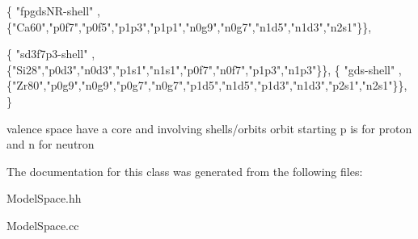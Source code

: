 \begin{DoxyCode}
\{ \textcolor{stringliteral}{"fpgdsNR-shell"}  ,   \{\textcolor{stringliteral}{"Ca60"},\textcolor{stringliteral}{"p0f7"},\textcolor{stringliteral}{"p0f5"},\textcolor{stringliteral}{"p1p3"},\textcolor{stringliteral}{"p1p1"},\textcolor{stringliteral}{"n0g9"},\textcolor{stringliteral}{"n0g7"},\textcolor{stringliteral}{"n1d5"},\textcolor{stringliteral}{"n1d3"},\textcolor{stringliteral}{"n2s1"}\}\}, 

\{ \textcolor{stringliteral}{"sd3f7p3-shell"}  ,   \{\textcolor{stringliteral}{"Si28"},\textcolor{stringliteral}{"p0d3"},\textcolor{stringliteral}{"n0d3"},\textcolor{stringliteral}{"p1s1"},\textcolor{stringliteral}{"n1s1"},\textcolor{stringliteral}{"p0f7"},\textcolor{stringliteral}{"n0f7"},\textcolor{stringliteral}{"p1p3"},\textcolor{stringliteral}{"n1p3"}\}\},
\{ \textcolor{stringliteral}{"gds-shell"} ,        \{\textcolor{stringliteral}{"Zr80"},\textcolor{stringliteral}{"p0g9"},\textcolor{stringliteral}{"n0g9"},\textcolor{stringliteral}{"p0g7"},\textcolor{stringliteral}{"n0g7"},\textcolor{stringliteral}{"p1d5"},\textcolor{stringliteral}{"n1d5"},\textcolor{stringliteral}{"p1d3"},\textcolor{stringliteral}{"n1d3"},\textcolor{stringliteral}{"p2s1"},\textcolor{stringliteral}{"n2s1"}\}\}, 
\}
\end{DoxyCode}
valence space have a core and involving shells/orbits orbit starting \textquotesingle{}p\textquotesingle{} is for proton and \textquotesingle{}n\textquotesingle{} for neutron 

The documentation for this class was generated from the following files\+:\begin{DoxyCompactItemize}
\item 
Model\+Space.\+hh\item 
Model\+Space.\+cc\end{DoxyCompactItemize}
